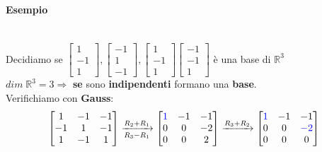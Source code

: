 \documentclass[a4paper, 12pt]{report}
\begin{document}
            \paragraph{Esempio}\mbox{}\\
                Decidiamo se 
                    $
                    \begin{bmatrix}
                        1\\
                        -1\\
                        1
                    \end{bmatrix}
                    ,
                    \begin{bmatrix}
                        -1\\
                        1\\
                        -1
                    \end{bmatrix}
                    ,
                    \begin{bmatrix}
                        1\\
                        -1\\
                        1
                    \end{bmatrix}
                    \begin{bmatrix}
                        -1\\
                        -1\\
                        1
                    \end{bmatrix}
                    $ è una base di $\mathbb{R}^3$\\
                    $dim \; \mathbb{R}^3 = 3 \Rightarrow$ \textbf{se} sono \textbf{indipendenti} formano una \textbf{base}.\\
                    Verifichiamo con \textbf{Gauss}:
                    $$
                    \begin{bmatrix}
                        1 & -1 & -1\\
                        -1 & 1 & -1\\
                        1 & -1 & 1
                    \end{bmatrix}
                    \xrightarrow[R_3-R_1]{R_2+R_1}
                    \begin{bmatrix}
                        \textcolor{blue}{1} & -1 & -1\\
                        0 & 0 & -2\\
                        0 & 0 & 2
                    \end{bmatrix}
                    \xrightarrow[]{R_3+R_2}
                    \begin{bmatrix}
                        \textcolor{blue}{1} & -1 & -1\\
                        0 & 0 & \textcolor{blue}{-2}\\
                        0 & 0 & 0
                    \end{bmatrix}                                                
                    $$
\end{document}
